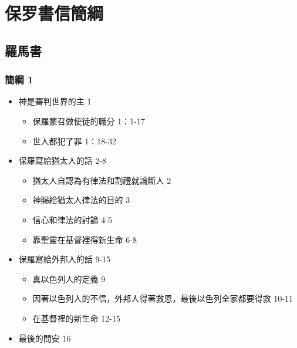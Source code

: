 
\section{保罗書信簡綱}

\subsection{羅馬書}
\subsubsection{簡綱 1}
\begin{itemize}%
\itemsep-.25em 
\item 神是審判世界的主 1
\begin{itemize}%
\itemsep-.25em 
\item 保羅蒙召做使徒的職分 1：1-17
\item 世人都犯了罪 1：18-32
\end{itemize}
\item 保羅寫給猶太人的話 2-8
\begin{itemize}%
\itemsep-.25em 
\item 猶太人自認為有律法和割禮就論斷人 2
\item 神賜給猶太人律法的目的 3
\item 信心和律法的討論 4-5
\item 靠聖靈在基督裡得新生命 6-8
\end{itemize}
\item 保羅寫給外邦人的話 9-15 
\begin{itemize}%
\itemsep-.25em 
\item 真以色列人的定義 9
\item 因著以色列人的不信，外邦人得著救恩，最後以色列全家都要得救  10-11
\item 在基督裡的新生命 12-15
\end{itemize}
\item 最後的問安 16
\end{itemize}

